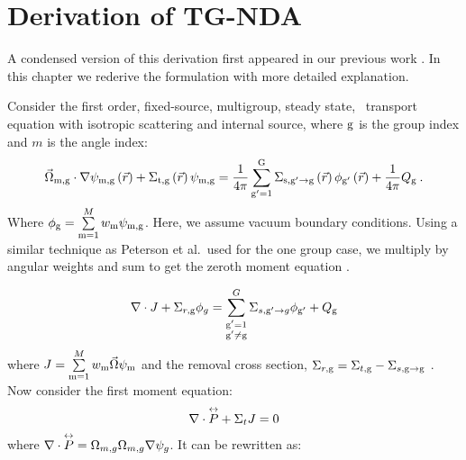 
\section{Derivation of TG-NDA}
A condensed version of this derivation first appeared in our previous work \cite{Ramirez2017}. In this chapter we rederive the formulation with more detailed explanation.

Consider the first order, fixed-source, multigroup, steady state, \sn\ transport equation with isotropic scattering and internal source, where $\mathrm{g}$ is the group index and $m$ is the angle index:
  \begin{equation}
  \vec{\Omega}_{\mathrm{m},\mathrm{g}}\cdot \nabla \psi_{\mathrm{m},\mathrm{g}} \left(\vec{r}\right)+ \Sigma_{\mathrm{t},\mathrm{g}}\left(\vec{r}\right)\psi_{\mathrm{m},\mathrm{g}} = \frac{1}{4 \pi} \sum\limits_{\mathrm{g}'=1}^{\mathrm{G}} \Sigma_{\mathrm{s},{\mathrm{g}'}\to\mathrm{g}}\left(\vec{r}\right) \phi_{\mathrm{g}'}\left(\vec{r}\right) + \frac{1}{4 \pi} Q_{\mathrm{g}}\:.
  \end{equation}
  Where $\phi_{\mathrm{g}} = \sum\limits_{\mathrm{m}=1}^M w_{\mathrm{m}} \psi_{\mathrm{m}, \mathrm{g}}$. Here, we assume vacuum boundary conditions. Using a similar technique as Peterson et al.\ used for the one group case, we multiply by angular weights and sum to get the zeroth moment equation \cite{morel-holo}.

  \begin{equation}
  \nabla \cdot J + \Sigma_{r,\mathrm{g}}\phi_g  = \sum_{\substack{\mathrm{g}'=1 \\ \mathrm{g}' \neq \mathrm{g}}}^G \Sigma_{s,\mathrm{g}' \rightarrow g}\phi_{\mathrm{g}'} + Q_{\mathrm{g}}
  \label{eq:zeroth_moment}
  \end{equation}
where $J = \sum\limits_{\mathrm{m}=1}^{M}w_{\mathrm{m}} \vec{\Omega}\psi_{\mathrm{m}}$ and the removal cross section, $\Sigma_{r, \mathrm{g}} = \Sigma_{t, \mathrm{g}} - \Sigma_{s, \mathrm{g} \rightarrow \mathrm{g}}$ . 
  Now consider the first moment equation:
  \begin{equation}
  \nabla \cdot \overset{\text{\scriptsize$\leftrightarrow$}}{P} + \Sigma_t J = 0
  \end{equation}
where $\nabla \cdot \overset{\text{\scriptsize$\leftrightarrow$}}{P} =  \Omega_{m,g} \Omega_{m,g} \nabla \psi_{g}$. It can be rewritten as: 

